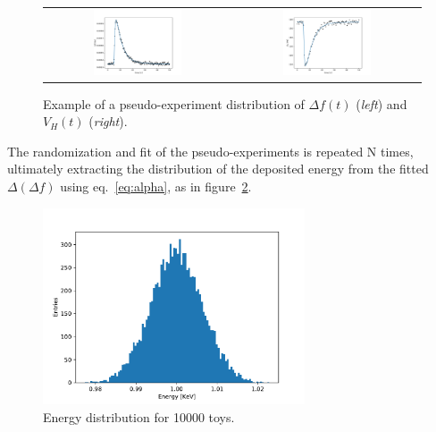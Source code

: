 \documentclass[a4paper,12pt]{article}
\begin{document}
\begin{figure}[!ht]
  \begin{center}
    \begin{tabular}{cc}
    \includegraphics[width=0.49\textwidth]{deltaf_toy-example} &
    \includegraphics[width=0.49\textwidth]{voltage_toy-example}
    \end{tabular}
    \caption{Example of a pseudo-experiment distribution of $\Delta f(t)$ (\textit{left}) and $V_H(t)$ (\textit{right}).}
    \label{fig:toy}
  \end{center}
\end{figure}

The randomization and fit of the pseudo-experiments is repeated N times, ultimately extracting the distribution of the deposited energy from the fitted $\Delta(\Delta f)$ using eq.~\ref{eq:alpha}, as in figure~\ref{fig:energy_distribution}.

\begin{figure}[!ht]
  \begin{center}
    \includegraphics[width=0.69\textwidth]{energy_distribution}
    \caption{Energy distribution for 10000 toys.}
    \label{fig:energy_distribution}
  \end{center}
\end{figure}
\end{document}
